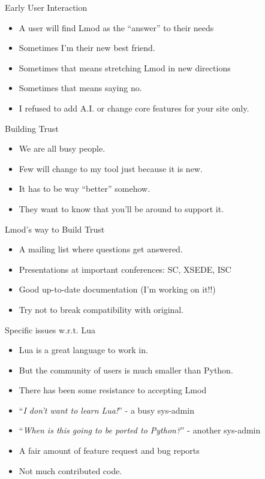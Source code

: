 \documentclass{beamer}
\begin{document}
\begin{frame}{Early User Interaction}
  \begin{itemize}
    \item A user will find Lmod as the ``answer'' to their needs
    \item Sometimes I'm their new best friend.
    \item Sometimes that means stretching Lmod in new directions
    \item Sometimes that means saying no.
    \item I refused to add A.I. or change core features for
      your site only.
  \end{itemize}
\end{frame}

\begin{frame}{Building Trust}
  \begin{itemize}
    \item We are all busy people.
    \item Few will change to my tool just because it is new.
    \item It has to be way ``better'' somehow.
    \item They want to know that you'll be around to support it. 
  \end{itemize}
\end{frame}

\begin{frame}{Lmod's way to Build Trust} 
  \begin{itemize}
    \item A mailing list where questions get answered.
    \item Presentations at important conferences: SC, XSEDE, ISC
    \item Good up-to-date documentation (I'm working on it!!)
    \item Try not to break compatibility with original.
  \end{itemize}
\end{frame}

\begin{frame}{Specific issues w.r.t. Lua}
  \begin{itemize}
    \item Lua is a great language to work in.
    \item But the community of users is much smaller than Python.
    \item There has been some resistance to accepting Lmod
    \item ``\emph{I don't want to learn Lua!}'' - a busy sys-admin
    \item ``\emph{When is this going to be ported to Python?}'' - another sys-admin
    \item A fair amount of feature request and bug reports
    \item Not much contributed code.
  \end{itemize}
\end{frame}
\end{document}
